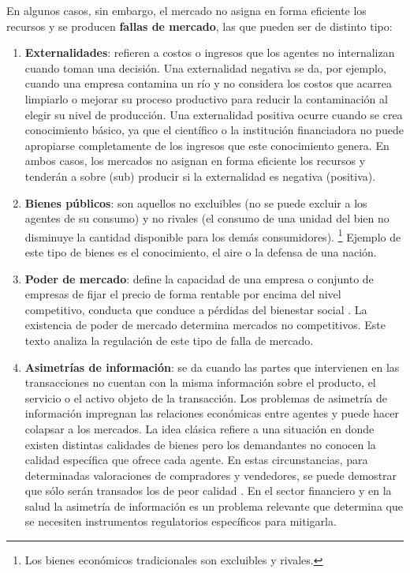 \documentclass[
  12pt,
  spanish,
]{book}
\begin{document}
En algunos casos, sin embargo, el mercado no asigna en forma eficiente los recursos y se producen \textbf{fallas de mercado}, las que pueden ser de distinto tipo:

\begin{enumerate}
\def\labelenumi{\arabic{enumi}.}
\item
  \textbf{Externalidades}: refieren a costos o ingresos que los agentes no internalizan cuando toman una decisión. Una externalidad negativa se da, por ejemplo, cuando una empresa contamina un río y no considera los costos que acarrea limpiarlo o mejorar su proceso productivo para reducir la contaminación al elegir su nivel de producción. Una externalidad positiva ocurre cuando se crea conocimiento básico, ya que el científico o la institución financiadora no puede apropiarse completamente de los ingresos que este conocimiento genera. En ambos casos, los mercados no asignan en forma eficiente los recursos y tenderán a sobre (sub) producir si la externalidad es negativa (positiva).
\item
  \textbf{Bienes públicos}: son aquellos no excluibles (no se puede excluir a los agentes de su consumo) y no rivales (el consumo de una unidad del bien no disminuye la cantidad disponible para los demás consumidores).
  \footnote{Los bienes económicos tradicionales son excluibles y rivales.}
  Ejemplo de este tipo de bienes es el conocimiento, el aire o la defensa de una nación.
\item
  \textbf{Poder de mercado}: define la capacidad de una empresa o conjunto de empresas de fijar el precio de forma rentable por encima del nivel competitivo, conducta que conduce a pérdidas del bienestar social \citep[p.~8]{Carlton2004}. La existencia de poder de mercado determina mercados no competitivos. Este texto analiza la regulación de este tipo de falla de mercado.
\item
  \textbf{Asimetrías de información}: se da cuando las partes que intervienen en las
  transacciones no cuentan con la misma información sobre el producto, el servicio o el activo objeto de la transacción. Los problemas de asimetría de información impregnan las relaciones económicas entre agentes y puede hacer colapsar a los mercados. La idea clásica refiere a una situación en donde existen distintas calidades de bienes pero los demandantes no conocen la calidad específica que ofrece cada agente. En estas circunstancias, para determinadas valoraciones de compradores y vendedores, se puede demostrar que sólo serán transados los de peor calidad \citep[pp.~244-245]{Wolfstetter1999}. En el sector financiero y en la salud la asimetría de información es un problema relevante que determina que se necesiten instrumentos regulatorios específicos para mitigarla.
\end{enumerate}
\end{document}
